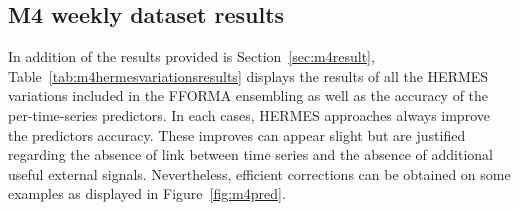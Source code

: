 \documentclass[review]{elsarticle}
\begin{document}
\subsection{M4 weekly dataset results}

In addition of the results provided is Section~\ref{sec:m4result}, Table~\ref{tab:m4hermesvariationsresults} displays the results of all the HERMES variations included in the FFORMA ensembling as well as the accuracy of the per-time-series predictors. In each cases, HERMES approaches always improve the predictors accuracy. These improves can appear slight but are justified regarding the absence of link between time series and the absence of additional useful external signals. Nevertheless, efficient corrections can be obtained on some examples as displayed in Figure~\ref{fig:m4pred}.

\begin{table}
  \caption{Results summary on the m4 weekly dataset of the HERMES variations. For each metric, the average on all the time series is computed. For approaches using a neural network, 10 models are trained with different seeds. The mean and the standard deviation of the 10 results are displayed. For the statistical models \textit{ets-add}, \textit{ets-mul} and \textit{thetam}, the Python package {\texttt{statsmodels}} is used. The Python package \texttt{tbats} is used for the \textit{tbats} approach.}
  \centering
\label{tab:m4hermesvariationsresults}
\end{table}
\end{document}
